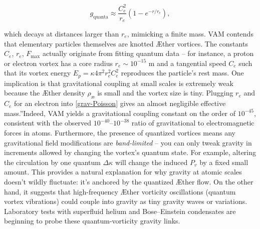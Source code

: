 \begin{equation}
    g_\text{quanta} \approx \frac{C_e^2}{r_e} \left(1 - e^{-r/r_e} \right),
    \label{eq:g_quanta}
\end{equation}

which decays at distances larger than $r_e$, mimicking a finite mass.
VAM contends that elementary particles themselves are knotted Æther vortices. The constants $C_e$, $r_e$, $F_{\max}$ actually originate from fitting quantum data – for instance, a proton or electron vortex has a core radius $r_e \sim 10^{-15}$ m and a tangential speed $C_e$ such that its vortex energy $E_p = \kappa 4\pi^2 r_e^2 C_e^2$ reproduces the particle's rest mass. One implication is that gravitational coupling at small scales is extremely weak because the Æther density $\rho_\text{\ae}$ is small and the vortex size is tiny. Plugging $r_e$ and $C_e$ for an electron into \eqref{grav-Poisson} gives an almost negligible effective \grqq mass.\textquotedblright Indeed, VAM yields a gravitational coupling constant on the order of $10^{-45}$, consistent with the observed $10^{-40}$–$10^{-38}$ ratio of gravitational to electromagnetic forces in atoms. Furthermore, the presence of quantized vortices means any gravitational field modifications are \textit{band-limited} – you can only tweak gravity in increments allowed by changing the vortex's quantum state. For example, altering the circulation by one quantum $\Delta \kappa$ will change the induced $P_v$ by a fixed small amount. This provides a natural explanation for why gravity at atomic scales doesn't wildly fluctuate: it's anchored by the quantized Æther flow. On the other hand, it suggests that high-frequency Æther vorticity oscillations (quantum vortex vibrations) could couple into gravity as tiny gravity waves or variations. Laboratory tests with superfluid helium and Bose–Einstein condensates are beginning to probe these quantum-vorticity gravity links.

